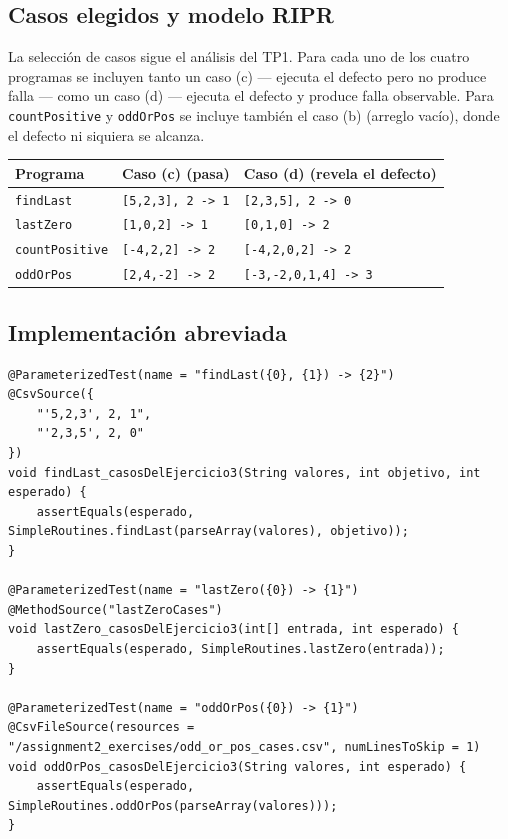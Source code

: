 \documentclass[12pt,a4paper]{article}
\begin{document}
\subsection{Casos elegidos y modelo RIPR}
La selección de casos sigue el análisis del TP1. Para cada uno de los cuatro programas se incluyen tanto un caso (c) --- ejecuta el defecto pero no produce falla --- como un caso (d) --- ejecuta el defecto y produce falla observable. Para \texttt{countPositive} y \texttt{oddOrPos} se incluye también el caso (b) (arreglo vacío), donde el defecto ni siquiera se alcanza.

\begin{center}
\begin{tabular}{lll}
\toprule
Programa & Caso (c) (pasa) & Caso (d) (revela el defecto) \\
\midrule
\texttt{findLast}      & \texttt{[5,2,3], 2 -> 1}  & \texttt{[2,3,5], 2 -> 0}      \\
\texttt{lastZero}      & \texttt{[1,0,2] -> 1}     & \texttt{[0,1,0] -> 2}         \\
\texttt{countPositive} & \texttt{[-4,2,2] -> 2}    & \texttt{[-4,2,0,2] -> 2}      \\
\texttt{oddOrPos}      & \texttt{[2,4,-2] -> 2}    & \texttt{[-3,-2,0,1,4] -> 3}   \\
\bottomrule
\end{tabular}
\end{center}

\subsection{Implementación abreviada}
\begin{lstlisting}[style=javastyle]
@ParameterizedTest(name = "findLast({0}, {1}) -> {2}")
@CsvSource({
    "'5,2,3', 2, 1",
    "'2,3,5', 2, 0"
})
void findLast_casosDelEjercicio3(String valores, int objetivo, int esperado) {
    assertEquals(esperado, SimpleRoutines.findLast(parseArray(valores), objetivo));
}

@ParameterizedTest(name = "lastZero({0}) -> {1}")
@MethodSource("lastZeroCases")
void lastZero_casosDelEjercicio3(int[] entrada, int esperado) {
    assertEquals(esperado, SimpleRoutines.lastZero(entrada));
}

@ParameterizedTest(name = "oddOrPos({0}) -> {1}")
@CsvFileSource(resources = "/assignment2_exercises/odd_or_pos_cases.csv", numLinesToSkip = 1)
void oddOrPos_casosDelEjercicio3(String valores, int esperado) {
    assertEquals(esperado, SimpleRoutines.oddOrPos(parseArray(valores)));
}
\end{lstlisting}
\end{document}
